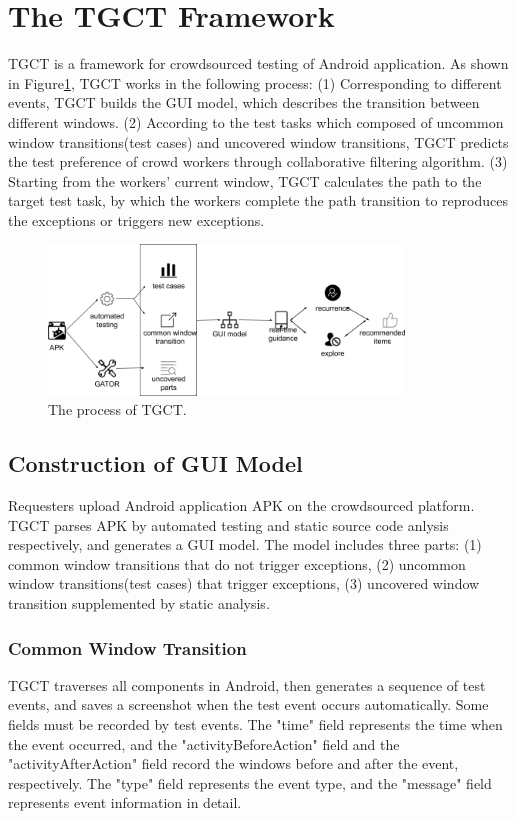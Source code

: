 \section{The TGCT Framework}
TGCT is a framework for crowdsourced testing of Android application. As shown in Figure\ref{fig:arch}, TGCT works in the following process: (1) Corresponding to different events, TGCT builds the GUI model, which describes the transition between different windows. (2) According to the test tasks which composed of uncommon window transitions(test cases) and uncovered window transitions, TGCT predicts the test preference of crowd workers through collaborative filtering algorithm. (3) Starting from the workers' current window, TGCT calculates the path to the target test task, by which the workers complete the path transition to reproduces the exceptions or triggers new exceptions.
\begin{figure}[htbp]
\centering
\centerline{\includegraphics[width=\columnwidth,height=4cm]{fig/2.png}}
\caption{The process of TGCT.}
\label{fig:arch}
\end{figure}

\subsection{Construction of GUI Model}
Requesters upload Android application APK on the crowdsourced platform. TGCT parses APK by automated testing and static source code anlysis respectively, and generates a GUI model. The model includes three parts:
(1) common window transitions that do not trigger exceptions, (2) uncommon window transitions(test cases) that trigger exceptions, (3) uncovered window transition supplemented by static analysis.

\subsubsection{Common Window Transition}
TGCT traverses all components in Android, then generates a sequence of test events, and saves a screenshot when the test event occurs automatically. Some fields must be recorded by test events. The "time" field represents the time when the event occurred, and the "activityBeforeAction" field and the "activityAfterAction" field record the windows before and after the event, respectively. The "type" field represents the event type, and the "message" field represents event information in detail.

